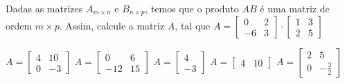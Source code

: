 Dadas as matrizes $A_{m\times n}$ e $B_{n\times p}$, temos que o produto $AB$ é uma matriz de ordem $m\times p$. Assim, calcule a matriz $A$, tal que $A = \left[ \begin{array}{cc}
0 & 2 \\
-6 & 3
\end{array} \right] \cdot \left[ \begin{array}{cc}
1 & 3 \\
2 & 5
\end{array} \right]$

$A=\left[ \begin{array}{cc} 4 & 10 \\ 0 & -3 \end{array} \right]$
$A=\left[ \begin{array}{cc} 0 & 6 \\ -12 & 15 \end{array} \right]$
$A=\left[ \begin{array}{c} 4 \\-3 \end{array} \right]$
$A=\left[ \begin{array}{cc} 4 & 10 \end{array} \right]$
$A=\left[ \begin{array}{cc} 2 & 5 \\ 0 & -\frac{3}{2} \end{array} \right]$


